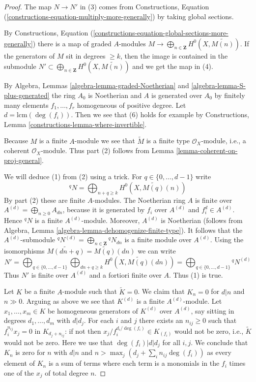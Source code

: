 \begin{proof}
The map $N \to N'$ in (3) comes from
Constructions, Equation (\ref{constructions-equation-multiply-more-generally})
by taking global sections.

\medskip\noindent
By
Constructions, Equation
(\ref{constructions-equation-global-sections-more-generally})
there is a map of graded $A$-modules
$M \to \bigoplus_{n \in \mathbf{Z}} H^0(X, \widetilde{M(n)})$.
If the generators of $M$ sit in degrees $\geq k$, then the image
is contained in the submodule
$N' \subset \bigoplus_{n \in \mathbf{Z}} H^0(X, \widetilde{M(n)})$
and we get the map in (4).

\medskip\noindent
By Algebra, Lemmas \ref{algebra-lemma-graded-Noetherian} and
\ref{algebra-lemma-S-plus-generated} the ring $A_0$ is Noetherian
and $A$ is generated over $A_0$ by finitely many elements
$f_1, \ldots, f_r$ homogeneous of positive degree.
Let $d = \text{lcm}(\deg(f_i))$. Then we see that (6) holds
for example by
Constructions, Lemma \ref{constructions-lemma-where-invertible}.

\medskip\noindent
Because $M$ is a finite $A$-module we see that
$\widetilde{M}$ is a finite type $\mathcal{O}_X$-module,
i.e., a coherent $\mathcal{O}_X$-module.
Thus part (2) follows from Lemma \ref{lemma-coherent-on-proj-general}.

\medskip\noindent
We will deduce (1) from (2) using a trick. For $q \in \{0, \ldots, d - 1\}$
write
$$
{}^qN = \bigoplus\nolimits_{n + q \geq k} H^0(X, \widetilde{M(q)}(n))
$$
By part (2) these are finite $A$-modules. The Noetherian ring $A$
is finite over $A^{(d)} = \bigoplus_{n \geq 0} A_{dn}$, because
it is generated by $f_i$ over $A^{(d)}$ and $f_i^d \in A^{(d)}$.
Hence ${}^qN$ is a finite $A^{(d)}$-module.
Moreover, $A^{(d)}$ is Noetherian (follows from
Algebra, Lemma \ref{algebra-lemma-dehomogenize-finite-type}).
It follows that the $A^{(d)}$-submodule
${}^qN^{(d)} = \bigoplus_{n \in \mathbf{Z}} {}^qN_{dn}$
is a finite module over $A^{(d)}$. Using the isomorphisms
$\widetilde{M(dn + q)} = \widetilde{M(q)}(dn)$ we can write
$$
N' =
\bigoplus\nolimits_{q \in \{0, \ldots, d - 1\}}
\bigoplus\nolimits_{dn + q \geq k}
H^0(X, \widetilde{M(q)}(dn)) =
\bigoplus\nolimits_{q \in \{0, \ldots, d - 1\}} {}^qN^{(d)}
$$
Thus $N'$ is finite over $A^{(d)}$ and a fortiori finite over $A$.
Thus (1) is true.

\medskip\noindent
Let $K$ be a finite $A$-module such that $\widetilde{K} = 0$. We claim
that $K_n = 0$ for $d|n$ and $n \gg 0$. Arguing as above we see that
$K^{(d)}$ is a finite $A^{(d)}$-module. Let
$x_1, \ldots, x_m \in K$ be homogeneous generators of $K^{(d)}$
over $A^{(d)}$, say sitting in degrees $d_1, \ldots, d_m$ with $d | d_j$.
For each $i$ and $j$ there exists an $n_{ij} \geq 0$ such that
$f_i^{n_{ij}} x_j = 0$ in $K_{d_j + n_{ij}}$: if not then
$x_j/f_i^{d_i/\deg(f_i)} \in K_{(f_i)}$ would not be zero, i.e.,
$\widetilde{K}$ would not be zero. Here we use that $\deg(f_i) | d | d_j$
for all $i, j$. We conclude that $K_n$ is zero for
$n$ with $d | n$ and $n > \max_j (d_j + \sum_i n_{ij} \deg(f_i))$
as every element of $K_n$ is a sum of terms where each term is a
monomials in the $f_i$ times one of the $x_j$ of total degree $n$.


\end{proof}
